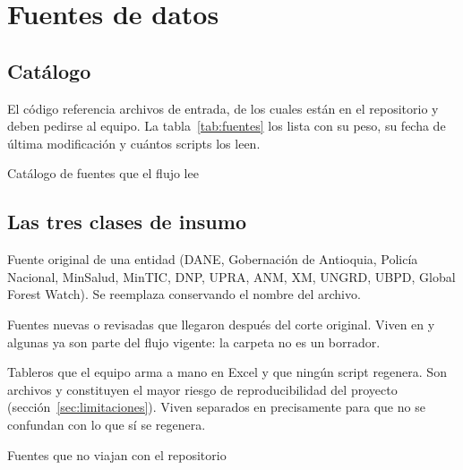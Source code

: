 \documentclass[11pt,a4paper]{article}
\begin{document}
\section{Fuentes de datos}

\subsection{Catálogo}

El código referencia \cifraInsumos{} archivos de entrada, de los cuales
\cifraInsumosPresentes{} están en el repositorio y \cifraInsumosAusentes{} deben
pedirse al equipo. La tabla~\ref{tab:fuentes} los lista con su peso, su fecha de
última modificación y cuántos scripts los leen.

\begin{table}[htbp]\centering
\caption{Catálogo de fuentes que el flujo lee}
\label{tab:fuentes}
\scriptsize

\end{table}

\subsection{Las tres clases de insumo}

\begin{description}[leftmargin=*, style=nextline, itemsep=3pt]
  \item[Crudo] Fuente original de una entidad (DANE, Gobernación de Antioquia,
    Policía Nacional, MinSalud, MinTIC, DNP, UPRA, ANM, XM, UNGRD, UBPD, Global
    Forest Watch). Se reemplaza conservando el nombre del archivo.
  \item[Actualización] Fuentes nuevas o revisadas que llegaron después del corte
    original. Viven en  y algunas ya son
    parte del flujo vigente: la carpeta no es un borrador.
  \item[Curado] Tableros que el equipo arma a mano en Excel y que ningún script
    regenera. Son \cifraCurados{} archivos y constituyen el mayor riesgo de
    reproducibilidad del proyecto (sección~\ref{sec:limitaciones}). Viven
    separados en  precisamente para que no se
    confundan con lo que sí se regenera.
\end{description}

\begin{table}[htbp]\centering
\caption{Fuentes que no viajan con el repositorio}
\small

\end{table}
\end{document}
